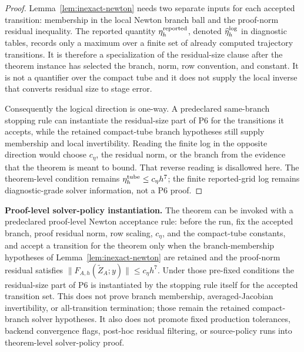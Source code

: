 \documentclass[preprint,12pt]{elsarticle}
\begin{document}
\begin{proof}
Lemma~\ref{lem:inexact-newton} needs two separate inputs for each accepted
transition: membership in the local Newton branch ball and the proof-norm
residual inequality.  The reported quantity
\(\eta_h^{\rm reported}\), denoted \(\widehat\eta_h^{\rm log}\) in
diagnostic tables, records only a maximum over a finite set of already
computed trajectory transitions.  It is therefore a specialization of the
residual-size clause after the theorem instance has selected the branch,
norm, row convention, and constant.  It is not a quantifier over the compact
tube and it does not supply the local inverse that converts residual size to
stage error.

Consequently the logical direction is one-way.  A predeclared same-branch
stopping rule can instantiate the residual-size part of P6 for the
transitions it accepts, while the retained compact-tube branch hypotheses
still supply membership and local invertibility.  Reading the finite log in
the opposite direction would choose \(c_\eta\), the residual norm, or the
branch from the evidence that the theorem is meant to bound.  That reverse
reading is disallowed here.  The theorem-level condition remains
\(\eta_h^{\rm tube}\le c_\eta h^7\); the finite reported-grid log remains
diagnostic-grade solver information, not a P6 proof.
\end{proof}

\noindent\textbf{Proof-level solver-policy instantiation.}
The theorem can be invoked with a predeclared proof-level Newton acceptance
rule: before the run, fix the accepted branch, proof residual norm,
row scaling, \(c_\eta\), and the compact-tube constants, and accept a
transition for the theorem only when the branch-membership hypotheses of
Lemma~\ref{lem:inexact-newton} are retained and the proof-norm residual
satisfies \(\|F_{A,h}(\widetilde Z_A;y)\|\le c_\eta h^7\).  Under those
pre-fixed conditions the residual-size part of P6 is instantiated by the
stopping rule itself for the accepted transition set.  This does not prove
branch membership, averaged-Jacobian invertibility, or all-transition
termination; those remain the retained compact-branch solver hypotheses.  It
also does not promote fixed production tolerances, backend convergence flags,
post-hoc residual filtering, or source-policy runs into theorem-level
solver-policy proof.
\end{document}
